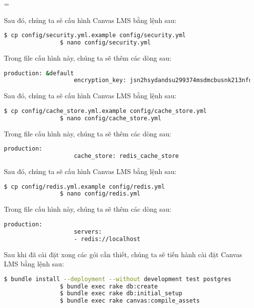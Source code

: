 =\documentclass[../Thesis.tex]{subfiles}
\begin{document}
\begin{enumerate}
            Sau đó, chúng ta sẽ cấu hình Canvas LMS bằng lệnh sau:
            \begin{lstlisting}[language=bash]
                $ cp config/security.yml.example config/security.yml
                $ nano config/security.yml
            \end{lstlisting}

            Trong file cấu hình này, chúng ta sẽ thêm các dòng sau:
            \begin{lstlisting}[language=bash]
                production: &default
                    encryption_key: jsn2hsydandsu299374msdmcbusnk213nfdu2
            \end{lstlisting}

            Sau đó, chúng ta sẽ cấu hình Canvas LMS bằng lệnh sau:
            \begin{lstlisting}[language=bash]
                $ cp config/cache_store.yml.example config/cache_store.yml
                $ nano config/cache_store.yml
            \end{lstlisting}

            Trong file cấu hình này, chúng ta sẽ thêm các dòng sau:
            \begin{lstlisting}[language=bash]
                production:
                    cache_store: redis_cache_store
            \end{lstlisting}

            Sau đó, chúng ta sẽ cấu hình Canvas LMS bằng lệnh sau:
            \begin{lstlisting}[language=bash]
                $ cp config/redis.yml.example config/redis.yml
                $ nano config/redis.yml
            \end{lstlisting}

            Trong file cấu hình này, chúng ta sẽ thêm các dòng sau:
            \begin{lstlisting}[language=bash]
                production:
                    servers:
                    - redis://localhost
            \end{lstlisting}

            Sau khi đã cài đặt xong các gói cần thiết, chúng ta sẽ tiến hành cài đặt Canvas LMS bằng lệnh sau:
            \begin{lstlisting}[language=bash]
                $ bundle install --deployment --without development test postgres
                $ bundle exec rake db:create
                $ bundle exec rake db:initial_setup
                $ bundle exec rake canvas:compile_assets
            \end{lstlisting}


\end{enumerate}
\end{document}
